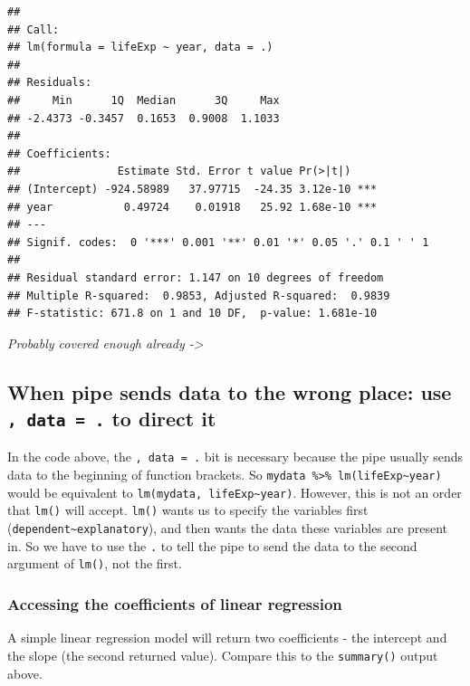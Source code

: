 \documentclass[12pt,]{krantz}
\theoremstyle{definition}
\theoremstyle{definition}
\theoremstyle{definition}
\theoremstyle{remark}
\begin{document}
\begin{verbatim}
## 
## Call:
## lm(formula = lifeExp ~ year, data = .)
## 
## Residuals:
##     Min      1Q  Median      3Q     Max 
## -2.4373 -0.3457  0.1653  0.9008  1.1033 
## 
## Coefficients:
##               Estimate Std. Error t value Pr(>|t|)    
## (Intercept) -924.58989   37.97715  -24.35 3.12e-10 ***
## year           0.49724    0.01918   25.92 1.68e-10 ***
## ---
## Signif. codes:  0 '***' 0.001 '**' 0.01 '*' 0.05 '.' 0.1 ' ' 1
## 
## Residual standard error: 1.147 on 10 degrees of freedom
## Multiple R-squared:  0.9853, Adjusted R-squared:  0.9839 
## F-statistic: 671.8 on 1 and 10 DF,  p-value: 1.681e-10
\end{verbatim}

\emph{Probably covered enough already -\textgreater{}}

\hypertarget{when-pipe-sends-data-to-the-wrong-place-use-data-.-to-direct-it}{%
\subsection{\texorpdfstring{When pipe sends data to the wrong place: use
\texttt{,\ data\ =\ .} to direct
it}{When pipe sends data to the wrong place: use , data = . to direct it}}\label{when-pipe-sends-data-to-the-wrong-place-use-data-.-to-direct-it}}

In the code above, the \texttt{,\ data\ =\ .} bit is necessary because
the pipe usually sends data to the beginning of function brackets. So
\texttt{mydata\ \%\textgreater{}\%\ lm(lifeExp\textasciitilde{}year)}
would be equivalent to
\texttt{lm(mydata,\ lifeExp\textasciitilde{}year)}. However, this is not
an order that \texttt{lm()} will accept. \texttt{lm()} wants us to
specify the variables first
(\texttt{dependent\textasciitilde{}explanatory}), and then wants the
data these variables are present in. So we have to use the \texttt{.} to
tell the pipe to send the data to the second argument of \texttt{lm()},
not the first.

\hypertarget{accessing-the-coefficients-of-linear-regression}{%
\subsubsection{Accessing the coefficients of linear
regression}\label{accessing-the-coefficients-of-linear-regression}}

A simple linear regression model will return two coefficients - the
intercept and the slope (the second returned value). Compare this to the
\texttt{summary()} output above.
\end{document}

